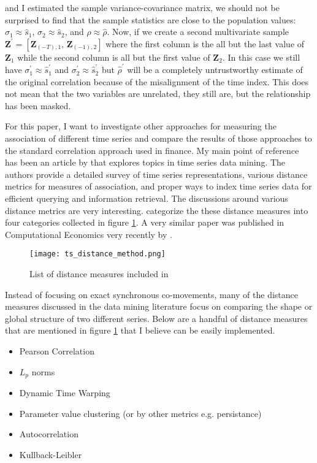 \documentclass[12pt]{article}
\begin{document}
and I estimated the sample variance-covariance matrix, we should not be surprised to find that the sample statistics are close to the population values: $\sigma_{1} \approx \hat{s}_{1}$, $\sigma_{2} \approx \hat{s}_{2}$, and $\rho \approx \hat{\rho}$. Now, if we create a second multivariate sample $\boldsymbol{Z}^\prime = [\boldsymbol{Z}_{(-T), 1}, \, \boldsymbol{Z}_{(-1), 2}]$ where the first column is the all but the last value of $\boldsymbol{Z}_{1}$ while the second column is all but the first value of $\boldsymbol{Z}_{2}$. In this case we still have $\sigma^{\prime}_{1} \approx \hat{s}^{\prime}_{1}$ and $\sigma^{\prime}_{2} \approx \hat{s}^{\prime}_{2}$ but $\hat{\rho}^{\prime}$ will be a completely untrustworthy estimate of the original correlation because of the misalignment of the time index. This does not mean that the two variables are unrelated, they still are, but the relationship has been masked.

For this paper, I want to investigate other approaches for measuring the association of different time series and compare the results of those approaches to the standard correlation approach used in finance. My main point of reference has been an article by \cite{ElsingAgon2012} that explores topics in time series data mining. The authors provide a detailed survey of time series representations, various distance metrics for measures of association, and proper ways to index time series data for efficient querying and information retrieval. The discussions around various distance metrics are very interesting. \cite{ElsingAgon2012} categorize the these distance measures into four categories collected in figure \ref{fig:ds_dist_meas_table}. A very similar paper was published in Computational Economics very recently by \cite{FrancesWiemann2020}.

\begin{figure}[!ht]
    \centering
    \texttt{[image: ts\_distance\_method.png]}
    \caption{List of distance measures included in \cite{ElsingAgon2012}}
    \label{fig:ds_dist_meas_table}
  \end{figure}

Instead of focusing on exact synchronous co-movements, many of the distance measures discussed in the data mining literature focus on comparing the shape or global structure of two different series. Below are a handful of distance measures that are mentioned in figure \ref{fig:ds_dist_meas_table} that I believe can be easily implemented.

\begin{itemize}
    \item Pearson Correlation
    \item $L_{p}$ norms
    \item Dynamic Time Warping
    \item Parameter value clustering (or by other metrics e.g. persistance)
    \item Autocorrelation
    \item Kullback-Leibler
\end{itemize}
\end{document}
